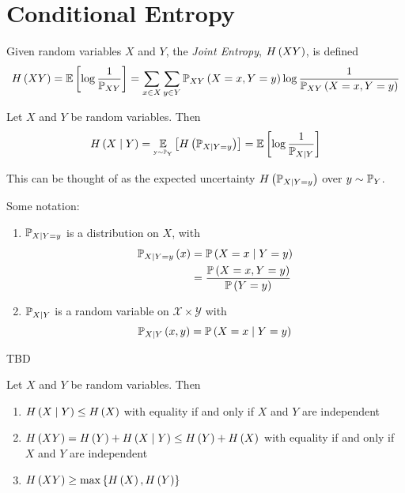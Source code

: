 \section{Conditional Entropy}
\begin{definition}
    Given random variables $X$ and $Y$, the \emph{Joint Entropy}, $H\left(XY\right)$,
    is defined
    \[\entropy{XY} = \expectation{\log\frac{1}{\Pr_{XY}}} = \sum_{x\in X}\sum_{y\in Y}\prob[XY]{X = x, Y = y}\log\frac{1}{\prob[XY]{X = x, Y = y}}\]
\end{definition}

\begin{definition}
    Let $X$ and $Y$ be random variables. Then
    \[\entropy{X \given Y} = \expectation[y \drawnfrom \Pr_Y]{\entropy{\Pr_{X \given Y = y}}} = \expectation{\log\frac{1}{\Pr_{X \given Y}}}\]
\end{definition}

This can be thought of as the expected uncertainty $H\left(\mathbb{P}_{X \mid Y = y}\right)$
over $y \sim \mathbb{P}_Y$.

\begin{definition}
    Some notation:
    \begin{enumerate}[label=(\arabic*)]
        \item $\mathbb{P}_{X \mid Y = y}$ is a distribution on $X$, with
              \begin{align*}\prob[X \given Y = y]{x}
                   & = \prob{X = x \given Y = y}                \\
                   & = \frac{\prob{X = x, Y = y}}{\prob{Y = y}}
              \end{align*}
        \item $\mathbb{P}_{X \mid Y}$ is a random variable on $\mathcal{X} \times \mathcal{Y}$ with
              \[\prob[X \given Y]{x, y} = \prob{X = x \given Y = y}\]
    \end{enumerate}
\end{definition}

\begin{example}
    TBD
\end{example}

\begin{theorem}
    Let $X$ and $Y$ be random variables. Then
    \begin{enumerate}[label=(\arabic*)]
        \item $H\left(X \mid Y\right) \leq H\left(X\right)$ with equality if and only if
              $X$ and $Y$ are independent
        \item $H\left(XY\right) = H\left(Y\right) + H\left(X \mid Y\right) \leq H\left(Y\right) + H\left(X\right)$
              with equality if and only if $X$ and $Y$ are independent
        \item $H\left(XY\right) \geq \max\left\lbrace H\left(X\right), H\left(Y\right)\right\rbrace$
    \end{enumerate}
\end{theorem}

